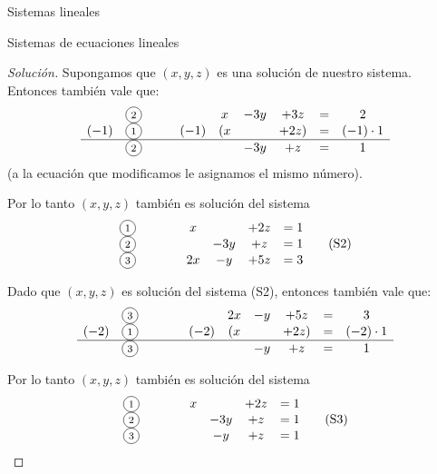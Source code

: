 \begin{chapter}{Sistemas lineales}
\begin{section}{Sistemas de ecuaciones lineales}
\begin{proof}[Solución]
    Supongamos que $(x,y,z)$ es una solución de nuestro sistema. Entonces también vale que: 
    \begin{equation*}
    \begin{matrix}
    &\text{\footnotesize\circled{2}}&\qquad&x& -3y & +3z & = & 2 \\
    (-1)&\text{\footnotesize\circled{1}}&\qquad(-1)&(x &  & +2z) & = &(-1)\cdot1 \\
    \hline
    &\text{\footnotesize\circled{2}}&\qquad&& -3y & +z & = & 1  
    \end{matrix}
    \end{equation*}
    (a la ecuación que modificamos le asignamos el mismo número).
     
    Por lo tanto $(x,y,z)$ también es solución del sistema
    \begin{equation*}
    \begin{matrix}
        \text{\footnotesize\circled{1}}&\qquad&x &  & +2z & = 1 \\
        \text{\footnotesize\circled{2}}&\qquad&& -3y & +z & = 1   \\
        \text{\footnotesize\circled{3}}&\qquad&2x& -y & +5z & =3
    \end{matrix}\tag{S2}
    \end{equation*}
 


 
Dado que $(x,y,z)$ es solución del sistema (S2),  entonces también vale que:
\begin{equation*}
\begin{matrix}
& \text{\footnotesize\circled{3}}&\qquad&&2x& -y & +5z & = &3 \\
(-2)& \text{\footnotesize\circled{1}}&\qquad&(-2)&(x &  & +2z) & = &(-2)\cdot1 \\
\hline
& \text{\footnotesize\circled{3}}&\qquad&& & -y & + z & = & 1  
\end{matrix}
\end{equation*}
 

Por lo tanto $(x,y,z)$ también es solución del sistema
\begin{equation*}
\begin{matrix}
    \text{\footnotesize\circled{1}}&\qquad&x &  & +2z & = 1 \\
    \text{\footnotesize\circled{2}}&\qquad&& -3y & +z & = 1   \\
    \text{\footnotesize\circled{3}}&\qquad&& -y & +z & =1
\end{matrix}\tag{S3}
\end{equation*}
 


\end{proof}
\end{section}
\end{chapter}
